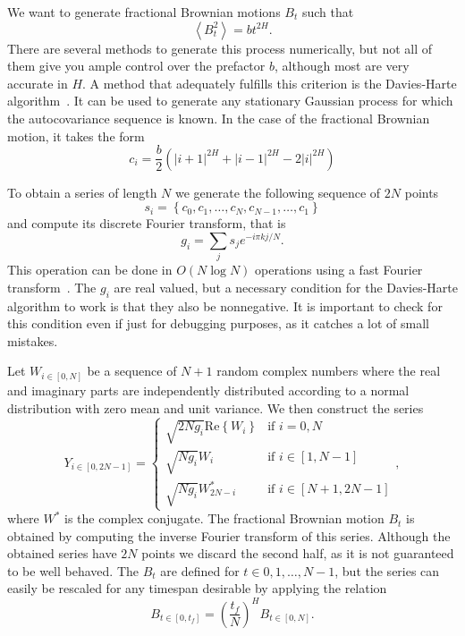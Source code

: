 We want to generate fractional Brownian motions $B_t$ such that
\begin{equation}
    \label{eq:fbm}
    \left\langle B_t^2 \right\rangle = bt^{2H}.
\end{equation}
There are several methods to generate this process numerically, but not all of
them give you ample control over the prefactor $b$, although most are very
accurate in $H$. A method that adequately fulfills this criterion is the
Davies-Harte algorithm~\cite{Davies1987}. It can be used to generate any
stationary Gaussian process for which the autocovariance sequence is known. In
the case of the fractional Brownian motion, it takes the form
\begin{equation}
    c_i = \frac{b}{2} \left(
            \left|i+1\right|^{2H} +
            \left|i-1\right|^{2H} -
            2\left|i\right|^{2H}
          \right)
\end{equation}

To obtain a series of length $N$ we generate the following sequence of $2N$
points
\begin{equation}
    s_i=\left\{c_{0},c_{1},\ldots,c_{N},c_{N-1},\ldots,c_{1}\right\}
\end{equation}
and compute its discrete Fourier transform, that is
\begin{equation}
    g_{i}=\sum_{j}s_{j}e^{-i\pi kj/N}.
\end{equation}
This operation can be done in $O(N\log N)$ operations using a fast Fourier
transform~\cite{Frigo2002}. The $g_i$ are real valued, but a necessary condition for the
Davies-Harte algorithm to work is that they also be nonnegative. It is
important to check for this condition even if just for debugging purposes,
as it catches a lot of small mistakes.

Let $W_{i\in[0,N]}$ be a sequence of $N+1$ random complex numbers where the
real and imaginary parts are independently distributed according to a normal
distribution with zero mean and unit variance. We then construct the series
\begin{equation}
    Y_{i\in[0,2N-1]}=\begin{cases}
        \sqrt{2Ng_{i}}\mbox{Re}\left\{ W_{i}\right\}  & \mbox{if } i=0,N\\
        \sqrt{Ng_{i}}W_{i} & \mbox{if } i\in\left[1, N-1\right]\\
        \sqrt{Ng_{i}}W_{2N-i}^{*} & \mbox{if } i\in\left[N+1, 2N-1\right]
    \end{cases},
\end{equation}
where $W^{*}$ is the complex conjugate. The fractional Brownian motion $B_t$ is
obtained by computing the inverse Fourier transform of this series. Although
the obtained series have $2N$ points we discard the second half, as it is not
guaranteed to be well behaved. The $B_t$ are defined for $t\in{0,1,\ldots,N-1}$,
but the series can easily be rescaled for any timespan desirable by applying
the relation
\begin{equation}
    B_{t\in[0,t_{f}]}={\left(\frac{t_{f}}{N}\right)}^{H}B_{t\in[0,N]}.
\end{equation}

